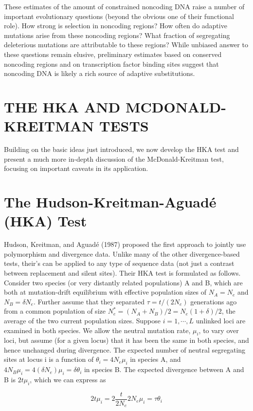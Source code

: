 \documentclass{article}
\begin{document}
These estimates of the amount of constrained noncoding DNA raise a number of important evolutionary questions (beyond the obvious one of their functional role). How strong is selection in noncoding regions? How often do adaptive mutations arise from these noncoding regions? What fraction of segregating deleterious mutations are attributable to these regions? While unbiased answer to these questions remain elusive, preliminary estimates based on conserved noncoding regions and on transcription factor binding sites suggest that noncoding DNA is likely a rich source of adaptive substitutions.

\section{THE HKA AND MCDONALD-KREITMAN TESTS}
Building on the basic ideas just introduced, we now develop the HKA test and present a much more in-depth discussion of the McDonald-Kreitman test, focusing on important caveats in its application.

\section{The Hudson-Kreitman-Aguadé (HKA) Test}
Hudson, Kreitman, and Aguadé (1987) proposed the first approach to jointly use polymorphism and divergence data. Unlike many of the other divergence-based tests, their's can be applied to any type of sequence data (not just a contrast between replacement and silent sites). Their HKA test is formulated as follows. Consider two species (or very distantly related populations) A and B, which are both at mutation-drift equilibrium with effective population sizes of  $ N_A = N_e $ and  $ N_B = \delta N_e $. Further assume that they separated  $ \tau = t/(2N_e) $ generations ago from a common population of size  $ N_e^* = (N_A + N_B)/2 = N_e(1 + \delta)/2 $, the average of the two current population sizes. Suppose  $ i = 1, \cdots, L $ unlinked loci are examined in both species. We allow the neutral mutation rate,  $ \mu_i $, to vary over loci, but assume (for a given locus) that it has been the same in both species, and hence unchanged during divergence. The expected number of neutral segregating sites at locus i is a function of  $ \theta_i = 4N_e\mu_i $ in species A, and  $ 4N_B\mu_i = 4(\delta N_e)\mu_i = \delta\theta_i $ in species B. The expected divergence between A and B is  $ 2t\mu_i $, which we can express as

\begin{equation}
2t\mu_{i}=2\frac{t}{2N_{e}}2N_{e}\mu_{i}=\tau\theta_{i}
\end{equation}
\end{document}

